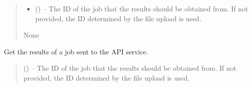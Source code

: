 \documentclass[letterpaper,11pt,english]{sphinxmanual}
\begin{document}
\begin{savenotes}
\begin{fulllineitems}
\begin{savenotes}
\begin{fulllineitems}
\begin{quote}
\begin{description}
\begin{itemize}
\begin{itemize}
\item {} 
\sphinxAtStartPar
{}: A table in of the location of stars detected in the
provided image.

\item {} 
\sphinxAtStartPar
{}: A table of the correspondences between reference
stars location in the sky and in pixel space.

\end{itemize}


\item {} 
\sphinxAtStartPar
{} (\sphinxstyleliteralemphasis{\sphinxupquote{, }}) – The ID of the job that the results should be obtained from. If not
provided, the ID determined by the file upload is used.

\end{itemize}

\sphinxAtStartPar
None

\end{description}\end{quote}

\end{fulllineitems}\end{savenotes}


\begin{savenotes}\begin{fulllineitems}
\label{\detokenize{code/opihiexarata.astrometry.webclient:opihiexarata.astrometry.webclient.AstrometryNetWebAPIEngine.get_job_results}}
\pysigstartsignatures
{}
\pysigstopsignatures
\sphinxAtStartPar
Get the results of a job sent to the API service.
\begin{quote}\begin{description}
\sphinxAtStartPar
{} (\sphinxstyleliteralemphasis{\sphinxupquote{, }}) – The ID of the job that the results should be obtained from. If not
provided, the ID determined by the file upload is used.


\end{description}
\end{quote}
\end{fulllineitems}
\end{savenotes}
\end{fulllineitems}
\end{savenotes}
\end{document}
